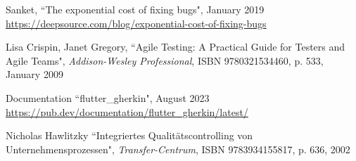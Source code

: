 \begin{thebibliography}{100}
\addtolength{\leftmargin}{0.2in}
\setlength{\itemindent}{-0.2in}


 Sanket, ``The exponential cost of fixing bugs", January 2019\\
\href{https://deepsource.com/blog/exponential-cost-of-fixing-bugs}{https://deepsource.com/blog/exponential-cost-of-fixing-bugs}

 Lisa Crispin, Janet Gregory, ``Agile Testing: A Practical Guide for Testers and Agile 
Teams", \emph{Addison-Wesley Professional}, ISBN 9780321534460, p. 533, January 2009

 Documentation ``flutter\_gherkin", August 2023\\
\href{https://pub.dev/documentation/flutter_gherkin/latest/}{https://pub.dev/documentation/flutter\_gherkin/latest/}

 Nicholas Hawlitzky ``Integriertes Qualitätscontrolling von Unternehmensprozessen",
\emph{Transfer-Centrum}, ISBN 9783934155817, p. 636, 2002

\end{thebibliography}
